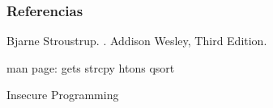 \begin{frame}[allowframebreaks]
   \frametitle<presentation>{Referencias}

   \begin{thebibliography}{10}

         \beamertemplatebookbibitems

         Bjarne Stroustrup.
         .
         \newblock Addison Wesley, Third Edition.

         \beamertemplatearticlebibitems
         
         man page: gets strcpy htons qsort
      
         Insecure Programming 
         

   \end{thebibliography}
\end{frame}




